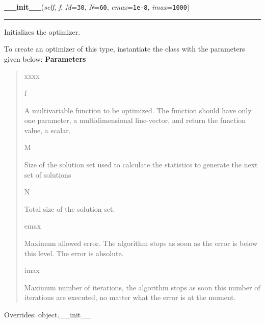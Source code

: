 \hspace{.8\funcindent}\begin{boxedminipage}{\funcwidth}

    \raggedright \textbf{\_\_init\_\_}(\textit{self}, \textit{f}, \textit{M}={\tt 30}, \textit{N}={\tt 60}, \textit{emax}={\tt 1e-8}, \textit{imax}={\tt 1000})

    \vspace{-1.5ex}

    \rule{\textwidth}{0.5\fboxrule}
\setlength{\parskip}{2ex}

Initializes the optimizer.

To create an optimizer of this type, instantiate the class with the
parameters given below:
\setlength{\parskip}{1ex}
      \textbf{Parameters}
      \vspace{-1ex}

      \begin{quote}
        \begin{Ventry}{xxxx}

          \item[f]


A multivariable function to be optimized. The function should have
only one parameter, a multidimensional line-vector, and return the
function value, a scalar.
          \item[M]


Size of the solution set used to calculate the statistics to
generate the next set of solutions
          \item[N]


Total size of the solution set.
          \item[emax]


Maximum allowed error. The algorithm stops as soon as the error is
below this level. The error is absolute.
          \item[imax]


Maximum number of iterations, the algorithm stops as soon this
number of iterations are executed, no matter what the error is at
the moment.
        \end{Ventry}

      \end{quote}

      Overrides: object.\_\_init\_\_

    \end{boxedminipage}

    \vspace{0.5ex}

